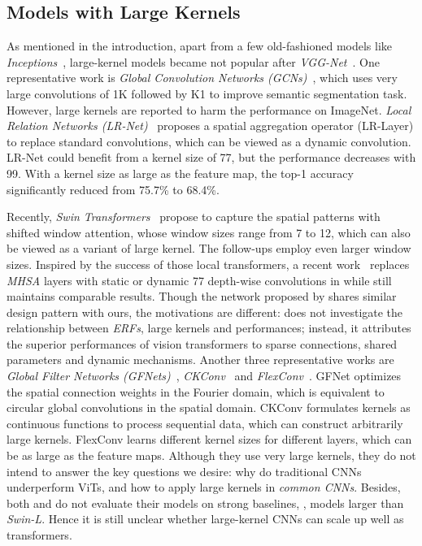 \documentclass[10pt,twocolumn,letterpaper]{article}
\begin{document}
	\subsection{Models with Large Kernels}
	
	As mentioned in the introduction, apart from a few old-fashioned models like \emph{Inceptions}~\cite{szegedy2015going,szegedy2016rethinking,szegedy2017inception}, large-kernel models became not popular after \emph{VGG-Net}~\cite{simonyan2014very}. One representative work is \emph{Global Convolution Networks (GCNs)}~\cite{peng2017large}, which uses very large convolutions of 1K followed by K1 to improve semantic segmentation task. However, large kernels are reported to harm the performance on ImageNet. \emph{Local Relation Networks (LR-Net)}~\cite{hu2019local} proposes a spatial aggregation operator (LR-Layer) to replace standard convolutions, which can be viewed as a dynamic convolution. LR-Net could benefit from a kernel size of 77, but the performance decreases with 99. With a kernel size as large as the feature map, the top-1 accuracy significantly reduced from 75.7\% to 68.4\%. 
	
	Recently, \emph{Swin Transformers}~\cite{swin} propose to capture the spatial patterns with shifted window attention, whose window sizes range from 7 to 12, which can also be viewed as a variant of large kernel. The follow-ups \cite{dong2021cswin,liu2021swin} employ even larger window sizes. Inspired by the success of those local transformers, a recent work~\cite{han2021demystifying} replaces \emph{MHSA} layers with static or dynamic 77 depth-wise convolutions in \cite{swin} while still maintains comparable results. Though the network proposed by \cite{han2021demystifying} shares similar design pattern with ours, the motivations are different: \cite{han2021demystifying} does not investigate the relationship between \emph{ERFs}, large kernels and performances; instead, it attributes the superior performances of vision transformers to sparse connections, shared parameters and dynamic mechanisms. Another three representative works are \emph{Global Filter Networks (GFNets)}~\cite{rao2021global}, \emph{CKConv}~\cite{romero2021ckconv} and \emph{FlexConv}~\cite{romero2021flexconv}. GFNet optimizes the spatial connection weights in the Fourier domain, which is equivalent to circular global convolutions in the spatial domain. CKConv formulates kernels as continuous functions to process sequential data, which can construct arbitrarily large kernels. FlexConv learns different kernel sizes for different layers, which can be as large as the feature maps. Although they use very large kernels, they do not intend to answer the key questions we desire: why do traditional CNNs underperform ViTs, and how to apply large kernels in \emph{common CNNs}.	Besides, both \cite{han2021demystifying} and \cite{rao2021global} do not evaluate their models on strong baselines, \eg, models larger than \emph{Swin-L}. Hence it is still unclear whether large-kernel CNNs can scale up well as transformers. 
\end{document}
